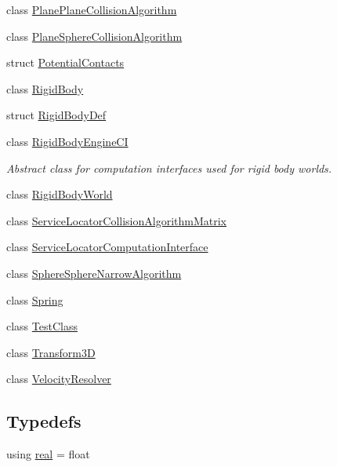 \begin{DoxyCompactItemize}
\item 
class \mbox{\hyperlink{classr3_1_1_plane_plane_collision_algorithm}{Plane\+Plane\+Collision\+Algorithm}}
\item 
class \mbox{\hyperlink{classr3_1_1_plane_sphere_collision_algorithm}{Plane\+Sphere\+Collision\+Algorithm}}
\item 
struct \mbox{\hyperlink{structr3_1_1_potential_contacts}{Potential\+Contacts}}
\item 
class \mbox{\hyperlink{classr3_1_1_rigid_body}{Rigid\+Body}}
\item 
struct \mbox{\hyperlink{structr3_1_1_rigid_body_def}{Rigid\+Body\+Def}}
\item 
class \mbox{\hyperlink{classr3_1_1_rigid_body_engine_c_i}{Rigid\+Body\+Engine\+CI}}
\begin{DoxyCompactList}\small\item\em Abstract class for computation interfaces used for rigid body worlds. \end{DoxyCompactList}\item 
class \mbox{\hyperlink{classr3_1_1_rigid_body_world}{Rigid\+Body\+World}}
\item 
class \mbox{\hyperlink{classr3_1_1_service_locator_collision_algorithm_matrix}{Service\+Locator\+Collision\+Algorithm\+Matrix}}
\item 
class \mbox{\hyperlink{classr3_1_1_service_locator_computation_interface}{Service\+Locator\+Computation\+Interface}}
\item 
class \mbox{\hyperlink{classr3_1_1_sphere_sphere_narrow_algorithm}{Sphere\+Sphere\+Narrow\+Algorithm}}
\item 
class \mbox{\hyperlink{classr3_1_1_spring}{Spring}}
\item 
class \mbox{\hyperlink{classr3_1_1_test_class}{Test\+Class}}
\item 
class \mbox{\hyperlink{classr3_1_1_transform3_d}{Transform3D}}
\item 
class \mbox{\hyperlink{classr3_1_1_velocity_resolver}{Velocity\+Resolver}}
\end{DoxyCompactItemize}
\subsection*{Typedefs}
\begin{DoxyCompactItemize}
\item 
using \mbox{\hyperlink{namespacer3_ab2016b3e3f743fb735afce242f0dc1eb}{real}} = float
\end{DoxyCompactItemize}
